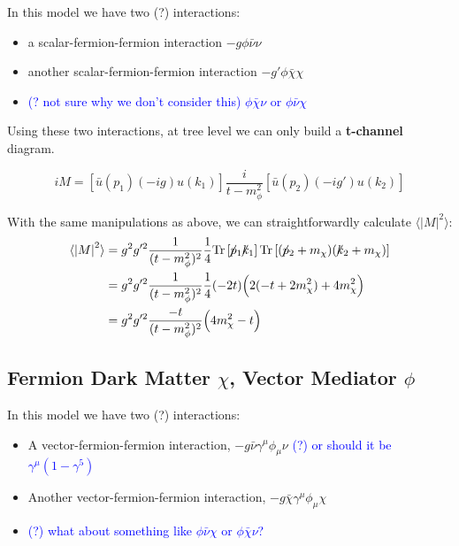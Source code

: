 \documentclass[11pt, oneside]{article}   	%
\newcommand{\fsl}[1]{\ensuremath{\mathrlap{\!\not{\phantom{#1}}}#1}}%
\begin{document}
In this model we have two (?) interactions:
\begin{itemize}
    \item a scalar-fermion-fermion interaction $-g\phi \bar{\nu}\nu$
    \item another scalar-fermion-fermion interaction $-g' \phi \bar{\chi} \chi$
    \item \textcolor{blue}{(? not sure why we don't consider this) $ \phi \bar{\chi} \nu$ or $\phi \bar{\nu} \chi$}
\end{itemize}

Using these two interactions, at tree level we can only build a \textbf{t-channel} diagram.

\[ iM = \left[ \bar{u}(p_1) (-i g) u(k_1) \right] \frac{i}{t - m_\phi^2} \left[ \bar{u}(p_2) (-i g') u(k_2) \right] \]

With the same manipulations as above, we can straightforwardly calculate $\langle \left| M \right|^2 \rangle$:
\begin{align*}
    \langle \left| M \right|^2 \rangle &= g^2 g'^2 \frac{1}{(t-m_\phi^2)^2} \frac{1}{4} \text{Tr} \left[ \fsl{p_1} \fsl{k_1} \right] \text{Tr} \left[ (\fsl{p_2} + m_\chi)(\fsl{k_2} + m_\chi) \right] \\
    & = g^2 g'^2 \frac{1}{(t-m_\phi^2)^2} \frac{1}{4} (-2t) \Big( 2(-t + 2m_\chi^2) + 4m_\chi^2 \Big) \\
    & = g^2 g'^2 \frac{-t}{(t-m_\phi^2)^2} \Big( 4m_\chi^2 - t \Big)
\end{align*}

\newpage
\subsection{\normalsize Fermion Dark Matter $\chi$, Vector Mediator $\phi$ } 

In this model we have two (?) interactions: 
\begin{itemize}
    \item A vector-fermion-fermion interaction, $-g\bar{\nu} \gamma^\mu \phi_\mu \nu$ \textcolor{blue}{(?) or should it be $\gamma^\mu (1 - \gamma^5)$}
    \item Another vector-fermion-fermion interaction, $-g \bar{\chi} \gamma^\mu \phi_\mu \chi$
    \item \textcolor{blue}{(?) what about something like $\phi \bar{\nu} \chi$ or $\phi \bar{\chi} \nu$?} 
\end{itemize}
\end{document}
